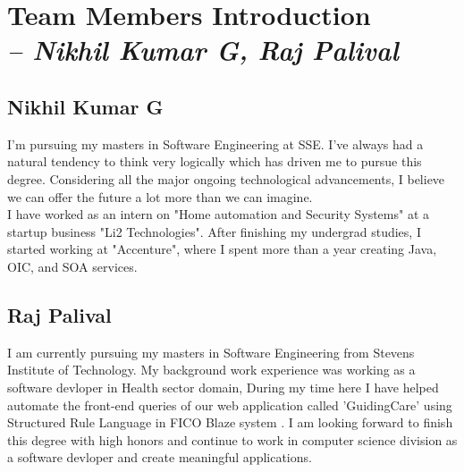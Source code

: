 \chapter{Team Members Introduction \\
\small{\textit{-- Nikhil Kumar G, Raj Palival}} 
\label{Chapter::Introduction}}

\section{Nikhil Kumar G \label{Section::chp1NikhilIntro}}
I'm pursuing my masters in Software Engineering at SSE. I've always had a natural tendency to think very logically which has driven me to pursue this degree. Considering all the major ongoing technological advancements, I believe we can offer the future a lot more than we can imagine.\\
I have worked as an intern on "Home automation and Security Systems"  at a startup business "Li2 Technologies".  After finishing my undergrad studies, I started working at "Accenture",  where I spent more than a year creating Java, OIC, and SOA services.   

\section{Raj Palival \label{Section::chp1RajIntro}}
I am currently pursuing my masters in Software Engineering from Stevens Institute of Technology. My background work experience was working as a software devloper in Health sector domain, During my time here I have helped automate the front-end queries  of our web application called 'GuidingCare' using Structured Rule Language in FICO Blaze system . I am looking forward to finish this degree with high honors and continue to work in computer science division as a software devloper and create meaningful applications.
